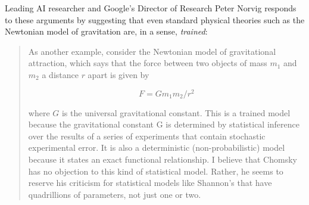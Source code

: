 \documentclass{article}
\begin{document}
Leading AI researcher and Google's Director of Research Peter Norvig responds to these arguments by suggesting that even standard physical theories such as the Newtonian model of gravitation are, in a sense, \emph{trained}:

\begin{quotation}
As another example, consider the Newtonian model of gravitational attraction, which says that the force between two objects of mass $m_1$ and $m_2$ a distance $r$ apart is given by

\begin{equation*}
F = G m_1 m_2 / r^2
\end{equation*}

where $G$ is the universal gravitational constant. This is a trained model because the gravitational constant G is determined by statistical inference over the results of a series of experiments that contain stochastic experimental error. It is also a deterministic (non-probabilistic) model because it states an exact functional relationship. I believe that Chomsky has no objection to this kind of statistical model. Rather, he seems to reserve his criticism for statistical models like Shannon's that have quadrillions of parameters, not just one or two.
\end{quotation}
\end{document}
